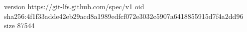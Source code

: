 version https://git-lfs.github.com/spec/v1
oid sha256:4f1f33adde42eb29acd8a1989edfcf072e3032c5907a6418855915d7f4a2dd96
size 87544
